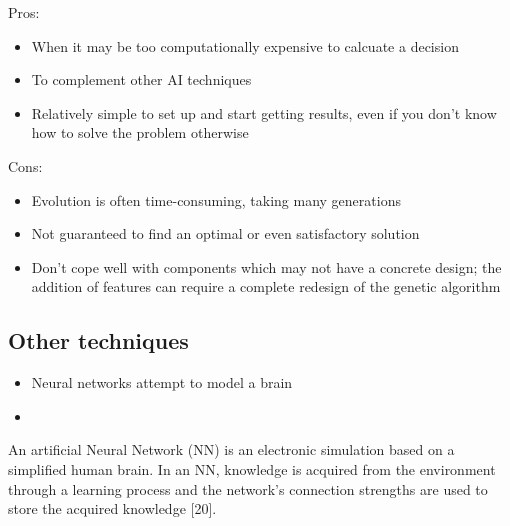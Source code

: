\documentclass[a4paper,oneside]{report}
\begin{document}
Pros:
\begin{itemize}
	\item When it may be too computationally expensive to calcuate a decision
	\item To complement other AI techniques
	\item Relatively simple to set up and start getting results, even if you don't know how to solve the problem otherwise
\end{itemize}

\noindent Cons:
\begin{itemize}
	\item Evolution is often time-consuming, taking many generations
	\item Not guaranteed to find an optimal or even satisfactory solution
	\item Don't cope well with components which may not have a concrete design; the addition of features can require a complete redesign of the genetic algorithm
\end{itemize}

\subsection{Other techniques}

\begin{itemize}
	\item Neural networks attempt to model a brain
	\item 
\end{itemize}

An artificial Neural Network (NN) is an electronic simulation based on a simplified human brain. In an NN, knowledge is acquired from the environment through a learning process and the network’s connection strengths are used to store the acquired knowledge [20].
\end{document}
